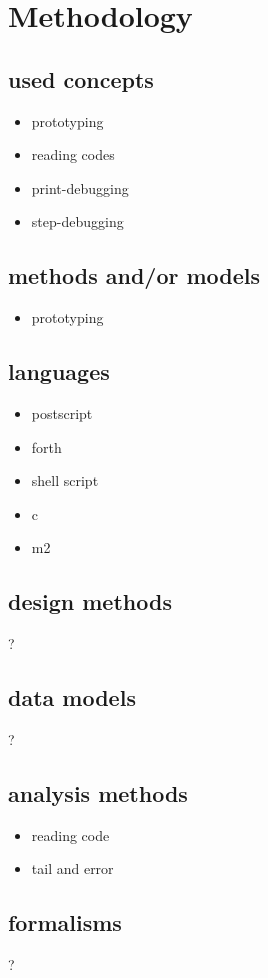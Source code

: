 \chapter{Methodology}

\section{used concepts}

\begin{itemize}
\item prototyping
\item reading codes
\item print-debugging
\item step-debugging
\end{itemize}

\section{methods and/or models}

\begin{itemize}
\item prototyping
\end{itemize}

\section{languages}

\begin{itemize}
\item postscript
\item forth
\item shell script
\item c
\item m2
\end{itemize}


\section{design methods}

?

\section{data models}

?

\section{analysis methods}

\begin{itemize}
\item reading code
\item tail and error
\end{itemize}

\section{formalisms}

?